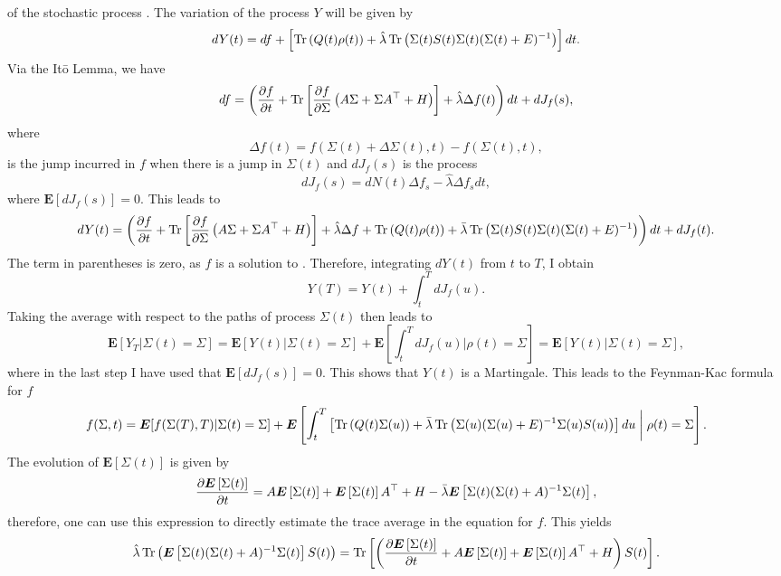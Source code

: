 of the stochastic process .
The variation of the process $Y$ will be given by
\[
dY(t) = df + \left[\operatorname{Tr}\left(Q(t)\rho(t)\right)+ \hat{\lambda} \operatorname{Tr} \left(\Sigma(t) S(t)\Sigma(t)(\Sigma(t)+E)^{-1}\right)\right]dt.
\]
Via the It\=o Lemma, we have
\[
df =\left(\frac{\partial f}{\partial t} + \operatorname{Tr}\left[\frac{\partial f}{\partial \Sigma} \left(A\Sigma + \Sigma A^\top + H\right)\right]+ \hat{\lambda} \Delta f(t) \right) dt+ d J_f(s),
\]
where 
\[
\Delta f(t) = f(\Sigma(t) + \Delta \Sigma(t),t) - f(\Sigma(t),t),
\]
is the jump incurred in $f$ when there is a jump in $\Sigma(t)$ and $dJ_f(s)$ is the process
\[
dJ_f(s) = dN(t) \Delta f_s - \hat{\lambda} \Delta f_s dt,
\]
where $\boldsymbol{E}[dJ_f(s)] = 0$. This leads to
\[
dY(t) = \left(\frac{\partial f}{\partial t} + \operatorname{Tr}\left[\frac{\partial f}{\partial \Sigma} \left(A\Sigma + \Sigma A^\top + H\right)\right] + \hat{\lambda} \Delta f + \operatorname{Tr}\left(Q(t)\rho(t)\right)+ 
\bar{\lambda} \operatorname{Tr} \left(\Sigma(t) S(t)\Sigma(t)(\Sigma(t)+E)^{-1}\right)\right)dt + dJ_f(t).
\]
The term in parentheses is zero, as $f$ is a solution to . Therefore, integrating $dY(t)$ from $t$ to $T$, I obtain
\[
Y(T) = Y(t) + \int_t^T dJ_f(u).
\]
Taking the average with respect to the paths of process $\Sigma(t)$ then leads to
\[
\boldsymbol{E}\left[Y_T|\Sigma(t)=\Sigma\right]=\boldsymbol{E}\left[Y(t)|\Sigma(t)=\Sigma\right] + \boldsymbol{E}\left[\int_t^T dJ_f(u)\mathrel{\bigg|}\rho(t)=\Sigma\right] =\boldsymbol{E}\left[Y(t)|\Sigma(t)=\Sigma\right] ,
\]
where in the last step I have used that $\boldsymbol{E}[dJ_f(s)] = 0$. This shows that $Y(t)$ is a Martingale. This leads to the Feynman-Kac formula for $f$
\begin{equation}
f(\Sigma,t) =\boldsymbol{E}[f(\Sigma(T),T)|\Sigma(t)=\Sigma] + \boldsymbol{E}\left[\int_t^T\left[\operatorname{Tr}\left(Q(t)\Sigma(u)\right)+ \bar{\lambda} \operatorname{Tr} \left(\Sigma(u)(\Sigma(u)+E)^{-1}\Sigma(u) S(u)\right)\right]du \mathrel{\bigg|} \rho(t)=\Sigma\right].
\end{equation}
The evolution of $\boldsymbol{E}\left[\Sigma(t)\right]$ is given by
\[
\frac{\partial \boldsymbol{E}\left[\Sigma(t)\right]}{\partial t} = A\boldsymbol{E}\left[\Sigma(t)\right] + \boldsymbol{E}\left[\Sigma(t)\right]A^\top +H- \bar{\lambda}\boldsymbol{E}\left[ \Sigma(t)(\Sigma(t) + A)^{-1} \Sigma(t)\right],
\]
therefore, one can use this expression to directly estimate the trace average in the equation for $f$. This yields
\[
\hat{\lambda} \operatorname{Tr}\left(\boldsymbol{E}\left[\Sigma(t)(\Sigma(t) + A)^{-1} \Sigma(t)\right] S(t)\right) = \operatorname{Tr}\left[\left(\frac{\partial \boldsymbol{E}\left[\Sigma(t)\right]}{\partial t} + A\boldsymbol{E}\left[\Sigma(t)\right] + \boldsymbol{E}\left[\Sigma(t)\right]A^\top +H\right)S(t)\right]. 
\]
